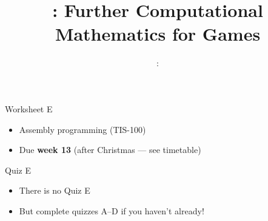 \usepackage{../../beamerthemeFalmouthGamesAcademy}
\usepackage{multimedia}
\graphicspath{ {../../} }

\lstset{language=Python
}

\usepackage[normalem]{ulem}
\usepackage{wasysym}

\usepackage{algpseudocode}

\usepackage{pdfpages}

\usetikzlibrary{arrows,automata}
\usetikzlibrary{tikzmark,calc}




\title{\sessionnumber: Further Computational Mathematics for Games}
\subtitle{\modulecode: \moduletitle}

\frame{\titlepage} 


\begin{frame}{Worksheet E}
	\begin{itemize}
		\item Assembly programming (TIS-100)
		\item Due \textbf{week 13} (after Christmas --- see timetable)
	\end{itemize}
\end{frame}

\begin{frame}{Quiz E}
	\begin{itemize}
		\item There is no Quiz E
		\item But complete quizzes A--D if you haven't already!
	\end{itemize}
\end{frame}

